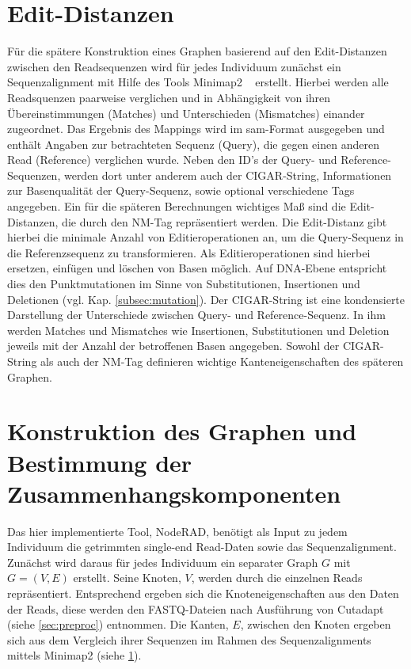 \section{Edit-Distanzen} \label{sec:edit}
Für die spätere Konstruktion eines Graphen basierend auf den Edit-Distanzen zwischen den Readsequenzen wird für jedes Individuum zunächst ein Sequenzalignment mit Hilfe des Tools Minimap2 ~\cite{li_2018} erstellt. Hierbei werden alle Readsquenzen paarweise verglichen und in Abhängigkeit von ihren Übereinstimmungen (Matches) und Unterschieden (Mismatches) einander zugeordnet. Das Ergebnis des Mappings wird im sam-Format ausgegeben und enthält Angaben zur betrachteten Sequenz (Query), die gegen einen anderen Read (Reference) verglichen wurde. Neben den ID's der Query- und Reference-Sequenzen, werden dort unter anderem auch der CIGAR-String, Informationen zur Basenqualität der Query-Sequenz, sowie optional verschiedene Tags angegeben. Ein für die späteren Berechnungen wichtiges Maß sind die Edit-Distanzen, die durch den NM-Tag repräsentiert werden. Die Edit-Distanz gibt hierbei die minimale Anzahl von Editieroperationen an, um die Query-Sequenz in die Referenzsequenz zu transformieren. Als Editieroperationen sind hierbei ersetzen, einfügen und löschen von Basen möglich. Auf DNA-Ebene entspricht dies den Punktmutationen im Sinne von Substitutionen, Insertionen und Deletionen (vgl. Kap. \ref{subsec:mutation}). Der CIGAR-String ist eine kondensierte Darstellung der Unterschiede zwischen Query- und Reference-Sequenz. In ihm werden Matches und Mismatches wie Insertionen, Substitutionen und Deletion jeweils mit der Anzahl der betroffenen Basen angegeben. Sowohl der CIGAR-String als auch der NM-Tag definieren wichtige Kanteneigenschaften des späteren Graphen. \\

\section{Konstruktion des Graphen und Bestimmung der Zusammenhangskomponenten} \label{sec:graph}

Das hier implementierte Tool, NodeRAD, benötigt als Input zu jedem Individuum die getrimmten single-end Read-Daten sowie das Sequenzalignment. Zunächst wird daraus für jedes Individuum ein separater Graph $ G $ mit $ G = (V,E) $ erstellt. Seine Knoten, $ V $, werden durch die einzelnen Reads repräsentiert. Entsprechend ergeben sich die Knoteneigenschaften aus den Daten der Reads, diese werden den FASTQ-Dateien nach Ausführung von Cutadapt (siehe \ref{sec:preproc}) entnommen. Die Kanten, $ E $, zwischen den Knoten ergeben sich aus dem Vergleich ihrer Sequenzen im Rahmen des Sequenzalignments mittels Minimap2 (siehe \ref{sec:edit}).

